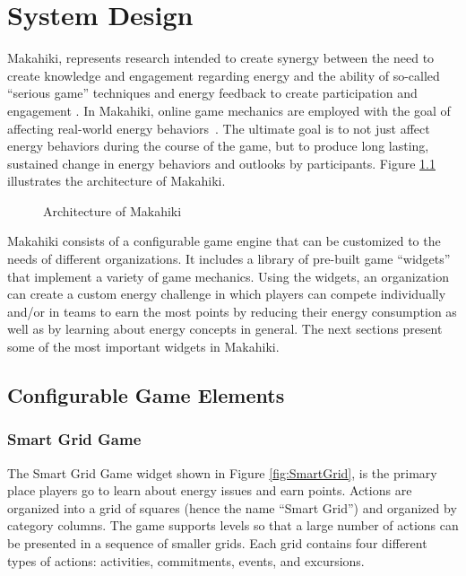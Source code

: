 \chapter{System Design}
\label{cha:system-description}

Makahiki, represents research intended to create synergy between the need to create knowledge and engagement regarding energy and the ability of so-called ``serious game'' techniques and energy feedback to create participation and engagement \cite{Deterding2011mt,darby-review-2006,Faruqui09,petersen-dorm-energy-reduction}. In Makahiki, online game mechanics are employed with the goal of affecting real-world energy behaviors~\cite{csdl2-10-07}.  The ultimate goal is to not just affect energy behaviors during the course of the game, but to produce long lasting, sustained change in energy behaviors and outlooks by participants. Figure \ref{fig:makahiki-architecture} illustrates the architecture of Makahiki.

\begin{figure}
\begin{center}
\end{center}
\caption{Architecture of Makahiki}
\label{fig:makahiki-architecture}
\end{figure}

Makahiki consists of a configurable game engine that can be customized to the needs of different organizations.  It includes a library of pre-built game ``widgets'' that implement a variety of game mechanics.  Using the widgets, an organization can create a custom energy challenge in which players can compete individually and/or in teams to earn the most points by reducing their energy consumption as well as by learning about energy concepts in general.  The next sections present some of the most important widgets in Makahiki.

\section{Configurable Game Elements}

\subsection{Smart Grid Game}

The Smart Grid Game widget shown in Figure \ref{fig:SmartGrid}, is the primary place players go to learn about energy issues and earn points. Actions are organized into a grid of squares (hence the name ``Smart Grid'') and organized by category columns. The game supports levels so that a large number of actions can be presented in a sequence of smaller grids. Each grid contains four different types of actions: activities, commitments, events, and excursions.

